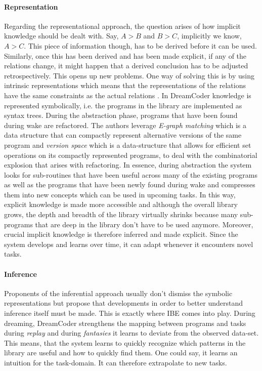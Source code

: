 \paragraph{Representation} Regarding the representational approach, the question arises of how implicit knowledge should be dealt with. Say, $A > B$ and $B > C$, implicitly we know, $A > C$. This piece of information though, has to be derived before it can be used. Similarly, once this has been derived and has been made explicit, if any of the relations change, it might happen that a derived conclusion has to be adjusted retrospectively. This opens up new problems. One way of solving this is by using intrinsic representations which means that the representations of the relations have the same constraints as the actual relations \cite{palmer1978fundamental}. 
In DreamCoder knowledge is represented symbolically, i.e. the programs in the library are implemented as syntax trees. During the abstraction phase, programs that have been found during wake are refactored. The authors leverage \emph{E-graph matching} which is a data structure that can compactly represent alternative versions of the same program and \emph{version space} which is a data-structure that allows for efficient set operations on its compactly represented programs, to deal with the combinatorial explosion that arises with refactoring. In essence, during abstraction the system looks for sub-routines that have been useful across many of the existing programs as well as the programs that have been newly found during wake and compresses them into new concepts which can be used in upcoming tasks. In this way, explicit knowledge is made more accessible and although the overall library grows, the depth and breadth of the library virtually shrinks because many sub-programs that are deep in the library don't have to be used anymore. Moreover, crucial implicit knowledge is therefore inferred and made explicit. Since the system develops and learns over time, it can adapt whenever it encounters novel tasks.
\paragraph{Inference} Proponents of the inferential approach usually don't dismiss the symbolic representations but propose that developments in order to better understand inference itself must be made. This is exactly where IBE comes into play. During dreaming, DreamCoder strengthens the mapping between programs and tasks during \emph{replay} and during \emph{fantasies} it learns to deviate from the observed data-set. This means, that the system learns to quickly recognize which patterns in the library are useful and how to quickly find them. One could say, it learns an intuition for the task-domain. It can therefore extrapolate to new tasks.

